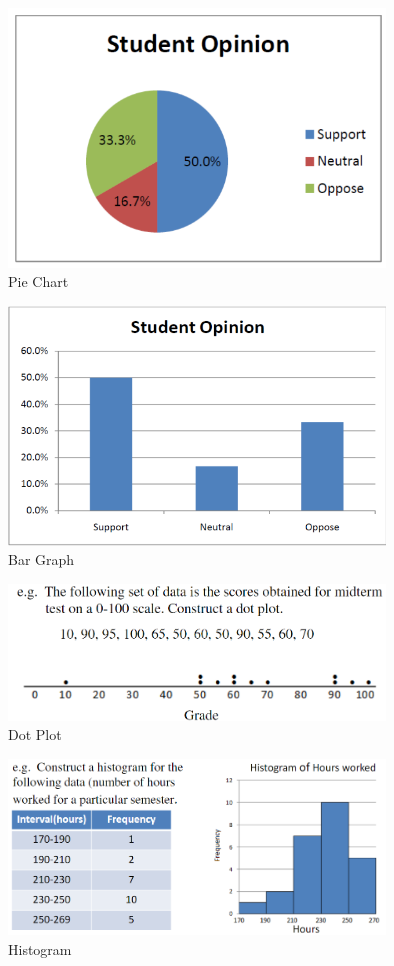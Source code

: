 \documentclass{article}
\begin{document}
    \begin{figure}[H]
        \centering
        \includegraphics[width=10cm]{figures/pie_chart.PNG}
        \caption{Pie Chart}
        \label{fig:pie_chart}
    \end{figure}
    \begin{figure}[H]
        \centering
        \includegraphics[width=10cm]{figures/bar_graph.PNG}
        \caption{Bar Graph}
        \label{fig:bar_graph}
    \end{figure}
    \begin{figure}[H]
        \centering
        \includegraphics[width=10cm]{figures/dot_graph.PNG}
        \caption{Dot Plot}
        \label{fig:dot_graph}
    \end{figure}
    \begin{figure}[H]
        \centering
        \includegraphics[width=10cm]{figures/histogram.PNG}
        \caption{Histogram}
        \label{fig:Histogram}
    \end{figure}
   
\end{document}
